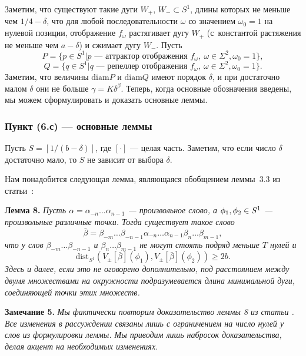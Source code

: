 \documentclass[12pt]{article}
\begin{document}
Заметим, что существуют такие дуги $W_+$, $W_-\subset S^1$, длины которых не меньше чем $1/4-\delta$, что для любой последовательности $\omega$ со значением $\omega_0=1$ на нулевой позиции,
отображение $f_{\omega}$ растягивает дугу $W_+$  (с~константой растяжения не меньше чем $a-\delta$) и сжимает дугу $W_-$. Пусть
$$P=\{p\in S^1| p\textrm{ --- аттрактор отображения }f_{\omega},\ \omega\in\Sigma^2, \omega_0=1\},$$
$$Q=\{q\in S^1| q\textrm{ --- репеллер отображения }f_{\omega},\ \omega\in\Sigma^2, \omega_0=1\}.$$
Заметим, что величины $\textrm{diam}P$ и $\textrm{diam}Q$ имеют порядок $\delta$, и при достаточно малом $\delta$ они не больше $\gamma=K\delta^{\beta}$. Теперь, когда основные обозначения введены, мы можем сформулировать и доказать основные леммы.

\subsubsection{Пункт (6.с) --- основные леммы}

Пусть $S=[1/(b-\delta)]$, где $[\cdot ]$ --- целая часть. Заметим, что если число $\delta$ достаточно мало, то $S$ не зависит от выбора $\delta$.

Нам понадобится следующая лемма, являющаяся обобщением леммы~3.3 из статьи~\cite{17}:

\textbf{Лемма 8.}
\textit{
Пусть $\alpha=\alpha_{-n}\ldots\alpha_{n-1}$ --- произвольное слово, а $\phi_1,\phi_2\in\nobreak S^1$ --- произвольные различные точки. Тогда существует такое слово 
$$\bar{\beta}=\beta_{-m}\ldots\beta_{-n-1}\alpha_{-n}\ldots\alpha_{n-1}\beta_n\ldots\beta_{m-1},$$
что у слов $\beta_{-m}\ldots\beta_{-n-1}$ и $\beta_n\ldots\beta_{m-1}$ не могут стоять подряд меньше $T$ нулей и
$$\mbox{dist}_{S^1}(V_{\pm}[\bar{\beta}](\phi_1),V_{\pm}[\bar{\beta}](\phi_2))\geq 2b.$$
Здесь и далее, если это не оговорено дополнительно, под расстоянием между двумя множествами на окружности подразумевается длина минимальной дуги, соединяющей точки этих множеств.
}

\textbf{Замечание 5.}
\textit{
  Мы фактически повторим доказательство леммы 8 из статьи \cite{17}. Все изменения в рассуждении связаны лишь с ограничением на число нулей у слов из формулировки леммы. Мы приводим лишь набросок доказательства, делая акцент на необходимых изменениях.
}
\end{document}

